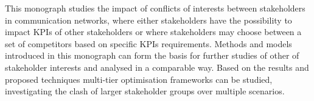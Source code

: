This monograph studies the impact of conflicts of interests between stakeholders in communication networks, where either stakeholders have the possibility to impact \glspl{KPI} of other stakeholders or where stakeholders may choose between a set of competitors based on specific \glspl{KPI} requirements.
Methods and models introduced in this monograph can form the basis for further studies of other of stakeholder interests and analysed in a comparable way.
Based on the results and proposed techniques multi-tier optimisation frameworks can be studied, investigating the clash of larger stakeholder groups over multiple scenarios.